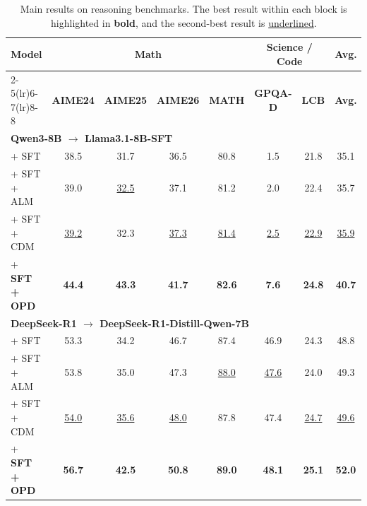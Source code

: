 \documentclass{article}
\theoremstyle{plain}
\theoremstyle{definition}
\theoremstyle{remark}
\begin{document}

\begin{table}[!t]
\centering
\caption{Main results on reasoning benchmarks. The best result within each block is highlighted in \textbf{bold}, and the second-best result is \underline{underlined}.}
\footnotesize
\setlength{\tabcolsep}{5pt}
\renewcommand{\arraystretch}{1.03}
\begin{tabular}{l|cccc|cc|c}
\toprule[1.3pt]
\textbf{Model} & \multicolumn{4}{c|}{\textbf{Math}} & \multicolumn{2}{c|}{\textbf{Science / Code}} & \textbf{Avg.} \\
\cmidrule(lr){2-5}\cmidrule(lr){6-7}\cmidrule(lr){8-8}
& \textbf{AIME24} & \textbf{AIME25} & \textbf{AIME26} & \textbf{MATH} & \textbf{GPQA-D} & \textbf{LCB} & \textbf{Avg.} \\
\midrule
\multicolumn{8}{l}{\textbf{Qwen3-8B $\rightarrow$ Llama3.1-8B-SFT}} \\
\midrule
+ SFT & 38.5 & 31.7 & 36.5 & 80.8 & 1.5 & 21.8 & 35.1 \\
+ SFT + ALM & 39.0 & \underline{32.5} & 37.1 & 81.2 & 2.0 & 22.4 & 35.7 \\
+ SFT + CDM & \underline{39.2} & 32.3 & \underline{37.3} & \underline{81.4} & \underline{2.5} & \underline{22.9} & \underline{35.9} \\
\rowcolor{myblue}+ \textbf{SFT + OPD} & \textbf{44.4} & \textbf{43.3} & \textbf{41.7} & \textbf{82.6} & \textbf{7.6} & \textbf{24.8} & \textbf{40.7} \\
\midrule
\multicolumn{8}{l}{\textbf{DeepSeek-R1 $\rightarrow$ DeepSeek-R1-Distill-Qwen-7B}} \\
\midrule
+ SFT & 53.3 & 34.2 & 46.7 & 87.4 & 46.9 & 24.3 & 48.8 \\
+ SFT + ALM & 53.8 & 35.0 & 47.3 & \underline{88.0} & \underline{47.6} & 24.0 & 49.3 \\
+ SFT + CDM & \underline{54.0} & \underline{35.6} & \underline{48.0} & 87.8 & 47.4 & \underline{24.7} & \underline{49.6} \\
\rowcolor{myblue}+ \textbf{SFT + OPD} & \textbf{56.7} & \textbf{42.5} & \textbf{50.8} & \textbf{89.0} & \textbf{48.1} & \textbf{25.1} & \textbf{52.0} \\
\bottomrule
\end{tabular}
\label{tab:main_results}
\end{table}
\end{document}
